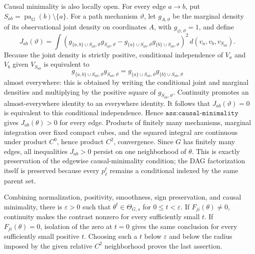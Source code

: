 Causal minimality is also locally open. For every edge \(a\to b\), put \(S_{ab}=\operatorname{pa}_G(b)\setminus\{a\}\). For a path mechanism \(\vartheta\), let \(g_{A,\vartheta}\) be the marginal density of its observational joint density on coordinates \(A\), with \(g_{\varnothing,\vartheta}=1\), and define
\[
 J_{ab}(\vartheta)
 =\int
 \left(g_{\{a,b\}\cup S_{ab},\vartheta}g_{S_{ab},\vartheta}
       -g_{\{a\}\cup S_{ab},\vartheta}g_{\{b\}\cup S_{ab},\vartheta}\right)^2
 \,d(v_a,v_b,v_{S_{ab}}).
\]
Because the joint density is strictly positive, conditional independence of \(V_a\) and \(V_b\) given \(V_{S_{ab}}\) is equivalent to
\[
 g_{\{a,b\}\cup S_{ab},\vartheta}g_{S_{ab},\vartheta}
 =g_{\{a\}\cup S_{ab},\vartheta}g_{\{b\}\cup S_{ab},\vartheta}
\]
almost everywhere: this is obtained by writing the conditional joint and marginal densities and multiplying by the positive square of \(g_{S_{ab},\vartheta}\). Continuity promotes an almost-everywhere identity to an everywhere identity. It follows that \(J_{ab}(\vartheta)=0\) is equivalent to this conditional independence. Hence \(\texttt{ass:causal-minimality}\) gives \(J_{ab}(\theta)>0\) for every edge. Products of finitely many mechanisms, marginal integration over fixed compact cubes, and the squared integral are continuous under product \(C^0\), hence product \(C^2\), convergence. Since \(G\) has finitely many edges, all inequalities \(J_{ab}>0\) persist on one neighborhood of \(\theta\). This is exactly preservation of the edgewise causal-minimality condition; the DAG factorization itself is preserved because every \(p_\ell^t\) remains a conditional indexed by the same parent set.

Combining normalization, positivity, smoothness, sign preservation, and causal minimality, there is \(\varepsilon>0\) such that \(\theta^t\in\Theta_{G,s}\) for \(0\le t<\varepsilon\). If \(F_{ji}(\theta)\ne0\), continuity makes the contrast nonzero for every sufficiently small \(t\). If \(F_{ji}(\theta)=0\), isolation of the zero at \(t=0\) gives the same conclusion for every sufficiently small positive \(t\). Choosing such a \(t\) below \(\varepsilon\) and below the radius imposed by the given relative \(C^2\) neighborhood proves the last assertion.


